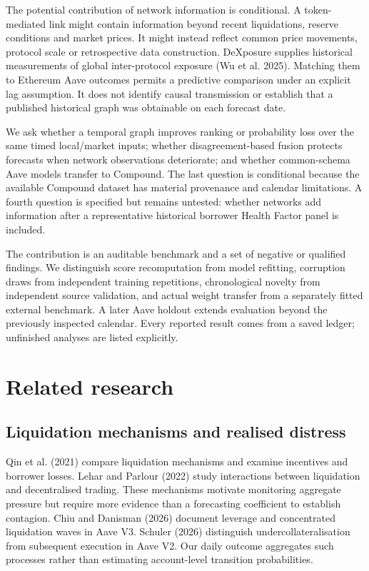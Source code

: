 \documentclass[
  10pt,
  a4paper,
]{article}
\begin{document}
The potential contribution of network information is conditional. A
token-mediated link might contain information beyond recent
liquidations, reserve conditions and market prices. It might instead
reflect common price movements, protocol scale or retrospective data
construction. DeXposure supplies historical measurements of global
inter-protocol exposure (Wu et al. 2025). Matching them to Ethereum Aave
outcomes permits a predictive comparison under an explicit lag
assumption. It does not identify causal transmission or establish that a
published historical graph was obtainable on each forecast date.

We ask whether a temporal graph improves ranking or probability loss
over the same timed local/market inputs; whether disagreement-based
fusion protects forecasts when network observations deteriorate; and
whether common-schema Aave models transfer to Compound. The last
question is conditional because the available Compound dataset has
material provenance and calendar limitations. A fourth question is
specified but remains untested: whether networks add information after a
representative historical borrower Health Factor panel is included.

The contribution is an auditable benchmark and a set of negative or
qualified findings. We distinguish score recomputation from model
refitting, corruption draws from independent training repetitions,
chronological novelty from independent source validation, and actual
weight transfer from a separately fitted external benchmark. A later
Aave holdout extends evaluation beyond the previously inspected
calendar. Every reported result comes from a saved ledger; unfinished
analyses are listed explicitly.

\section{Related research}\label{related-research}

\subsection{Liquidation mechanisms and realised
distress}\label{liquidation-mechanisms-and-realised-distress}

Qin et al. (2021) compare liquidation mechanisms and examine incentives
and borrower losses. Lehar and Parlour (2022) study interactions between
liquidation and decentralised trading. These mechanisms motivate
monitoring aggregate pressure but require more evidence than a
forecasting coefficient to establish contagion. Chiu and Danisman (2026)
document leverage and concentrated liquidation waves in Aave V3. Schuler
(2026) distinguish undercollateralisation from subsequent execution in
Aave V2. Our daily outcome aggregates such processes rather than
estimating account-level transition probabilities.
\end{document}
